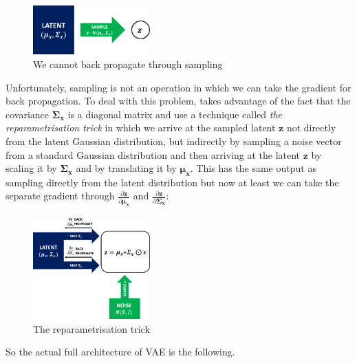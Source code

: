                 \begin{figure}[H] \label{fig:sampling}
                    \centering
                    \includegraphics[width=0.4\textwidth]{imgs/sampling.png}
                    \caption{We cannot back propagate through sampling}
                \end{figure}
                
                Unfortunately, sampling is not an operation in which we can take the gradient for back propagation. To deal with this problem, \cite{kingma2013auto} takes advantage of the fact that the covariance $\bm{\Sigma_x}$ is a diagonal matrix and use a technique called \textit{the reparametrisation trick} in which we arrive at the sampled latent $\bm{z}$ not directly from the latent Gaussian distribution, but indirectly by sampling a noise vector from a standard Gaussian distribution and then arriving at the latent $\bm{z}$ by scaling it by $\bm{\Sigma_x}$ and by translating it by $\bm{\mu_x}$. This has the same output as sampling directly from the latent distribution but now at least we can take the separate gradient through $\frac{\partial \bm{z}}{\partial \bm{\mu_x}}$ and $\frac{\partial \bm{z}}{\partial \bm{\Sigma_x}}$:
                
                \begin{figure}[H] \label{fig:reparametrisation_trick}
                    \centering
                    \includegraphics[width=0.4\textwidth]{imgs/reparametrisation_trick.png}
                    \caption{The reparametrisation trick}
                \end{figure}
                
                So the actual full architecture of VAE is the following.
                
